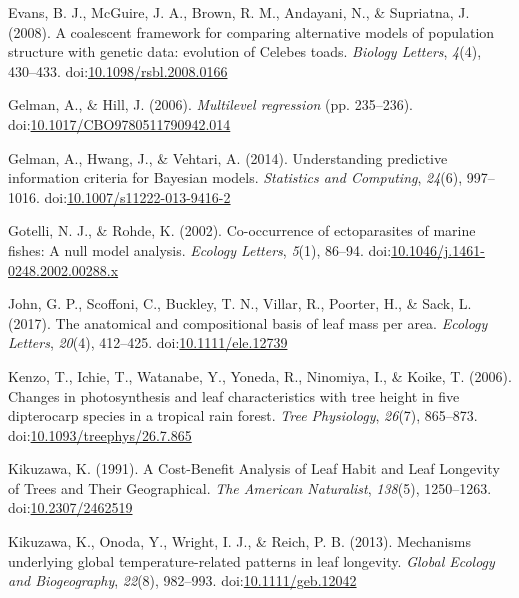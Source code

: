 \documentclass[12pt,]{article}
\theoremstyle{definition}
\theoremstyle{definition}
\theoremstyle{definition}
\theoremstyle{remark}
\begin{document}
\leavevmode\hypertarget{ref-Evans2008}{}%
Evans, B. J., McGuire, J. A., Brown, R. M., Andayani, N., \& Supriatna,
J. (2008). A coalescent framework for comparing alternative models of
population structure with genetic data: evolution of Celebes toads.
\emph{Biology Letters}, \emph{4}(4), 430--433.
doi:\href{https://doi.org/10.1098/rsbl.2008.0166}{10.1098/rsbl.2008.0166}

\leavevmode\hypertarget{ref-Gelman2006}{}%
Gelman, A., \& Hill, J. (2006). \emph{Multilevel regression} (pp.
235--236).
doi:\href{https://doi.org/10.1017/CBO9780511790942.014}{10.1017/CBO9780511790942.014}

\leavevmode\hypertarget{ref-Gelman2014}{}%
Gelman, A., Hwang, J., \& Vehtari, A. (2014). Understanding predictive
information criteria for Bayesian models. \emph{Statistics and
Computing}, \emph{24}(6), 997--1016.
doi:\href{https://doi.org/10.1007/s11222-013-9416-2}{10.1007/s11222-013-9416-2}

\leavevmode\hypertarget{ref-Gotelli2002}{}%
Gotelli, N. J., \& Rohde, K. (2002). Co-occurrence of ectoparasites of
marine fishes: A null model analysis. \emph{Ecology Letters},
\emph{5}(1), 86--94.
doi:\href{https://doi.org/10.1046/j.1461-0248.2002.00288.x}{10.1046/j.1461-0248.2002.00288.x}

\leavevmode\hypertarget{ref-John2017}{}%
John, G. P., Scoffoni, C., Buckley, T. N., Villar, R., Poorter, H., \&
Sack, L. (2017). The anatomical and compositional basis of leaf mass per
area. \emph{Ecology Letters}, \emph{20}(4), 412--425.
doi:\href{https://doi.org/10.1111/ele.12739}{10.1111/ele.12739}

\leavevmode\hypertarget{ref-Kenzo2006}{}%
Kenzo, T., Ichie, T., Watanabe, Y., Yoneda, R., Ninomiya, I., \& Koike,
T. (2006). Changes in photosynthesis and leaf characteristics with tree
height in five dipterocarp species in a tropical rain forest. \emph{Tree
Physiology}, \emph{26}(7), 865--873.
doi:\href{https://doi.org/10.1093/treephys/26.7.865}{10.1093/treephys/26.7.865}

\leavevmode\hypertarget{ref-Kikuzawa1991}{}%
Kikuzawa, K. (1991). A Cost-Benefit Analysis of Leaf Habit and Leaf
Longevity of Trees and Their Geographical. \emph{The American
Naturalist}, \emph{138}(5), 1250--1263.
doi:\href{https://doi.org/10.2307/2462519}{10.2307/2462519}

\leavevmode\hypertarget{ref-Kikuzawa2013}{}%
Kikuzawa, K., Onoda, Y., Wright, I. J., \& Reich, P. B. (2013).
Mechanisms underlying global temperature-related patterns in leaf
longevity. \emph{Global Ecology and Biogeography}, \emph{22}(8),
982--993.
doi:\href{https://doi.org/10.1111/geb.12042}{10.1111/geb.12042}
\end{document}
